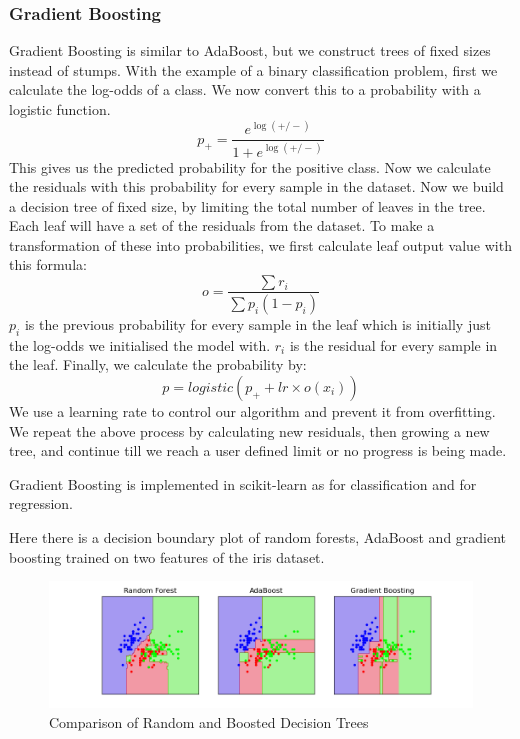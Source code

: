 \documentclass{article}
\newcommand{\code}[1]{{\fontfamily{zi4} \selectfont{#1}}}
\begin{document}
\subsubsection{Gradient Boosting}
Gradient Boosting is similar to AdaBoost, but we construct trees of fixed sizes instead of stumps. With the example of a binary classification problem, first we calculate the log-odds of a class. We now convert this to a probability with a logistic function.
$$p_+ = \frac{e^{\log{(+/-)}}}{1 + e^{\log{(+/-)}}}$$
This gives us the predicted probability for the positive class. Now we calculate the residuals with this probability for every sample in the dataset. Now we build a decision tree of fixed size, by limiting the total number of leaves in the tree. Each leaf will have a set of the residuals from the dataset. To make a transformation of these into probabilities, we first calculate leaf output value with this formula:
$$o = \frac{\sum r_i}{\sum p_i(1-p_i)}$$
$p_i$ is the previous probability for every sample in the leaf which is initially just the log-odds we initialised the model with. $r_i$ is the residual for every sample in the leaf. Finally, we calculate the probability by:
$$p = logistic(p_+ + lr \times o(x_i))$$
We use a learning rate to control our algorithm and prevent it from overfitting. We repeat the above process by calculating new residuals, then growing a new tree, and continue till we reach a user defined limit or no progress is being made.

Gradient Boosting is implemented in scikit-learn as \code{sklearn.ensemble.GradientBoostingClassifier()} for classification and \code{sklearn.ensemble.GradientBoostingRegressor} for regression.

Here there is a decision boundary plot of random forests, AdaBoost and gradient boosting trained on two features of the iris dataset.

\begin{figure}[H]
\includegraphics[width=\linewidth]{Images/random_boosting_trees.png}
\centering
\caption{Comparison of Random and Boosted Decision Trees}
\end{figure}
\end{document}
